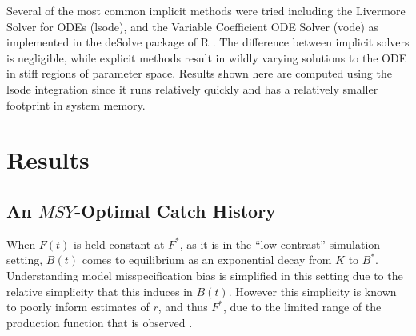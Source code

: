 %
Several of the most common implicit methods were tried including the
Livermore Solver for ODEs (lsode), and the Variable Coefficient ODE Solver
(vode) as implemented in the deSolve package of R \cite{soetaert_solving_2010}.
The difference between implicit solvers is negligible, while explicit
methods result in wildly varying solutions to the ODE in stiff regions of
parameter space. %
Results shown here are computed using the lsode integration %
since it runs relatively quickly and has a relatively smaller footprint in system memory.


%
%

%
\clearpage

\section{Results}

%
\vspace{-0.45cm}
\subsection{An $MSY$-Optimal Catch History \label{flat}}

%
When $F(t)$ is held constant at $F^*$, as it is in the ``low contrast''
simulation setting, $B(t)$ comes to equilibrium as an exponential decay from
$K$ to $B^*$. Understanding model misspecification bias is simplified in this
setting due to the relative simplicity that this induces in $B(t)$. However
this simplicity is known to poorly inform estimates of $r$, and thus $F^*$,
due to the limited range of the production function that is observed
\cite{hilborn_quantitative_1992}.


